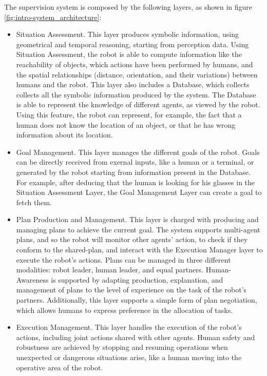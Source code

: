The supervision system is composed by the following layers, as shown in figure \ref{fig:intro-system_architecture}:
\begin{itemize}
\item Situation Assessment. This layer produces symbolic information, using geometrical and temporal reasoning, starting from perception data. Using Situation Assessment, the robot is able to compute information like the reachability of objects, which actions have been performed by humans, and the spatial relationships (distance, orientation, and their variations) between humans and the robot. This layer also includes a Database, which collects collects all the symbolic information produced by the system. The Database is able to represent the knowledge of different agents, as viewed by the robot. Using this feature, the robot can represent, for example, the fact that a human does not know the location of an object, or that he has wrong information about its location.
\item Goal Management. This layer manages the different goals of the robot. Goals can be directly received from exernal inputs, like a human or a terminal, or generated by the robot starting from information present in the Database. For example, after deducing that the human is looking for his glasses in the Situation Assessment Layer, the Goal Management Layer can create a goal to fetch them. 
\item Plan Production and Management. This layer is charged with producing and managing plans to achieve the current goal. The system supports multi-agent plans, and so the robot will monitor other agents' action, to check if they conform to the shared-plan, and interact with the Execution Manager layer to execute the robot's actions. Plans can be managed in three different modalities: robot leader, human leader, and equal partners. Human-Awareness is supported by adapting  production, explanation, and management of plans to the level of experience on the task of the robot's partners. Additionally, this layer supports a simple form of plan negotiation, which allows humans to express preference in the allocation of tasks.
\item Execution Management. This layer handles the execution of the robot's actions, including joint actions shared with other agents. Human safety and robustness are achieved by stopping and resuming operations  when unexpected or dangerous situations arise, like a human moving into the operative area of the robot.
\end{itemize}


